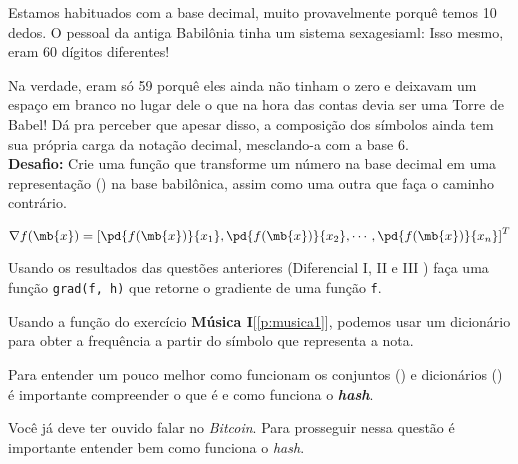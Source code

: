 	Estamos habituados com a base decimal, muito provavelmente porquê temos 10 dedos. O pessoal da antiga Babilônia tinha um sistema sexagesiaml: Isso mesmo, eram 60 dígitos diferentes!
	
	
	Na verdade, eram só 59 porquê eles ainda não tinham o zero e deixavam um espaço em branco no lugar dele o que na hora das contas devia ser uma Torre de Babel! Dá pra perceber que apesar disso, a composição dos símbolos ainda tem sua própria carga da notação decimal, mesclando-a com a base 6.\\
	
	\textbf{Desafio:} Crie uma função que transforme um número na base decimal em uma representação () na base babilônica, assim como uma outra que faça o caminho contrário.	
		
	
	
	
	$$\nabla f(\mb{x}) = \left[
	\pd{f(\mb{x})}{x_1},
	\pd{f(\mb{x})}{x_2},
	\cdots,
	\pd{f(\mb{x})}{x_n}
	\right]^{T}$$
	
	\quest Usando os resultados das questões anteriores (Diferencial I, II e III ) faça uma função \texttt{grad(f, h)} que retorne o gradiente de uma função \texttt{f}.
	
	
	Usando a função do exercício \textbf{Música I}[\ref{p:musica1}], podemos usar um dicionário para obter a frequência a partir do símbolo que representa a nota.


	\begin{interlude}{ \incomplete \label{i:hash}}
		
	Para entender um pouco melhor como funcionam os conjuntos () e dicionários () é importante compreender o que é e como funciona o \textit{\textbf{hash}}.
	
	
	
	\end{interlude}	
	
	\label{p:blockchain}
	
	Você já deve ter ouvido falar no \textit{Bitcoin}. Para prosseguir nessa questão é importante entender bem como funciona o \textit{hash}.\\
	
